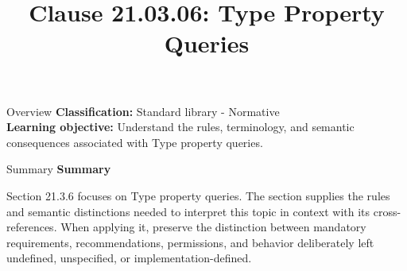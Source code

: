\documentclass[10pt,letterpaper]{article}
\title{Clause 21.03.06: Type Property Queries}
\author{}
\date{}
\begin{document}
\maketitle
\begin{CornellOverviewBox}{Overview}
\textbf{Classification:} Standard library - Normative\\[2pt]
\textbf{Learning objective:} Understand the rules, terminology, and semantic consequences associated with Type property queries.
\end{CornellOverviewBox}\begin{CornellSummaryBox}{Summary}
{\sffamily\bfseries\color{Accent} Summary}\par\vspace{3pt}Section 21.3.6 focuses on Type property queries. The section supplies the rules and semantic distinctions needed to interpret this topic in context with its cross-references. When applying it, preserve the distinction between mandatory requirements, recommendations, permissions, and behavior deliberately left undefined, unspecified, or implementation-defined.
\end{CornellSummaryBox}
\end{document}
